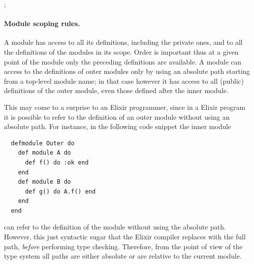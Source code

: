 \documentclass[a4paper,10pt]{article}
\begin{document}
; 


\paragraph{Module scoping rules.} A module has access to all its definitions, including the private ones, and to all the definitions of the modules in its scope. Order is important thus at a given point of the module only the preceding definitions are available. A module can access to the definitions  of outer modules only by using an absolute path starting from a top-level module name; in that case however it has access to all (public) definitions of the outer module, even those defined after the inner module.

This may come to a surprise to an Elixir programmer, since in a Elixir program it is possible to refer to the definition of an outer module without using an absolute path. For instance, in the following code snippet the inner module 
\begin{verbatim}
  defmodule Outer do
    def module A do
      def f() do :ok end
    end
    def module B do
      def g() do A.f() end
    end
  end
\end{verbatim}
can refer to the definition of the module  without using the absolute path. However, this just syntactic sugar that the Elixir compiler replaces with the full path, \emph{before} performing type checking. Therefore, from the point of view of the type system all paths are either absolute or are relative to the current module.
\end{document}
